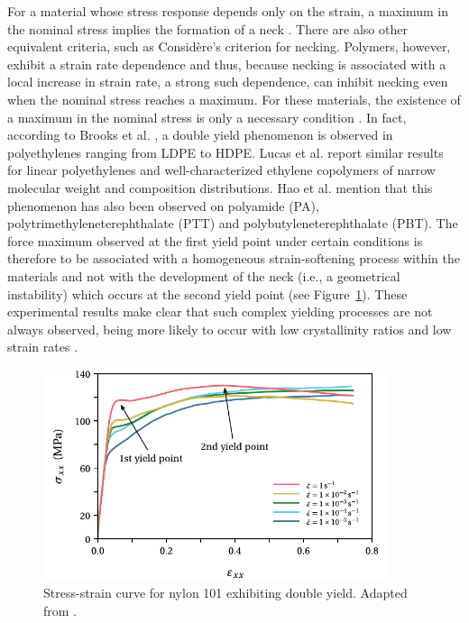 For a material whose stress response depends only on the strain, a maximum in the nominal stress implies the formation of a neck \citep{wardIntroductionMechanicalProperties2004}.
There are also other equivalent criteria, such as Considère's criterion for necking.
Polymers, however, exhibit a strain rate dependence and thus, because necking is associated with a local increase in strain rate, a strong such dependence, can inhibit necking even when the nominal stress reaches a maximum.
For these materials, the existence of a maximum in the nominal stress is only a necessary condition \citep{wardIntroductionMechanicalProperties2004}.
In fact, according to Brooks et al. \citep{brooksModelingDoubleYield1995}, a double yield phenomenon is observed in polyethylenes ranging from LDPE to HDPE.
Lucas et al. \cite{lucasDoubleYieldTensile1995} report similar results for linear polyethylenes and well-characterized ethylene copolymers of narrow molecular weight and composition distributions.
Hao et al. \citep{haoRatedependentConstitutiveModel2022} mention that this phenomenon has also been observed on polyamide (PA), polytrimethyleneterephthalate (PTT) and polybutyleneterephthalate (PBT).
The force maximum observed at the first yield point under certain conditions is therefore to be associated with a homogeneous strain-softening process within the materials and not with the development of the neck (i.e., a geometrical instability) which occurs at the second yield point (see Figure~\ref{fig:double_yield}).
These experimental results make clear that such complex yielding processes are not always observed, being more likely to occur with low crystallinity ratios and low strain rates \citep{zengConstitutiveModelSemicrystalline2010}.
\begin{figure}[htbp]
	\centering
	\includegraphics[width=0.9\textwidth]{figures/double_yield}
	\caption{Stress-strain curve for nylon 101 exhibiting double yield. Adapted from \cite{khanThermomechanicalResponseNylon2006}.}
\label{fig:double_yield}
\end{figure}

